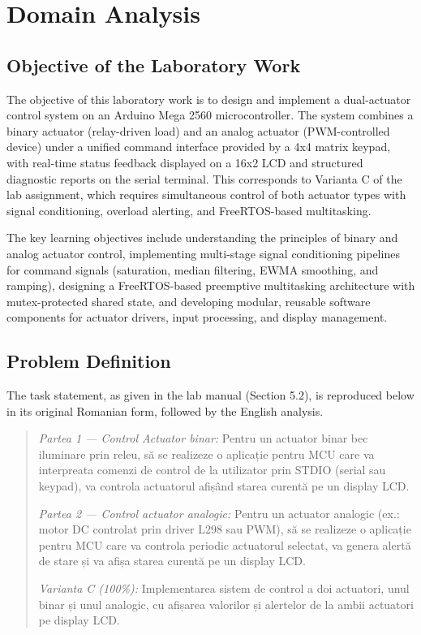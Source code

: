\section{Domain Analysis}

\subsection{Objective of the Laboratory Work}

The objective of this laboratory work is to design and implement a dual-actuator control system on an Arduino Mega 2560 microcontroller. The system combines a binary actuator (relay-driven load) and an analog actuator (PWM-controlled device) under a unified command interface provided by a 4x4 matrix keypad, with real-time status feedback displayed on a 16x2 LCD and structured diagnostic reports on the serial terminal. This corresponds to Varianta C of the lab assignment, which requires simultaneous control of both actuator types with signal conditioning, overload alerting, and FreeRTOS-based multitasking.

The key learning objectives include understanding the principles of binary and analog actuator control, implementing multi-stage signal conditioning pipelines for command signals (saturation, median filtering, EWMA smoothing, and ramping), designing a FreeRTOS-based preemptive multitasking architecture with mutex-protected shared state, and developing modular, reusable software components for actuator drivers, input processing, and display management.

\subsection{Problem Definition}

The task statement, as given in the lab manual (Section 5.2), is reproduced below in its original Romanian form, followed by the English analysis.

\begin{quote}
\textit{Partea 1 --- Control Actuator binar:} Pentru un actuator binar bec iluminare prin releu, să se realizeze o aplicație pentru MCU care va interpreata comenzi de control de la utilizator prin STDIO (serial sau keypad), va controla actuatorul afișând starea curentă pe un display LCD.

\textit{Partea 2 --- Control actuator analogic:} Pentru un actuator analogic (ex.: motor DC controlat prin driver L298 sau PWM), să se realizeze o aplicație pentru MCU care va controla periodic actuatorul selectat, va genera alertă de stare și va afișa starea curentă pe un display LCD.

\textit{Varianta C (100\%):} Implementarea sistem de control a doi actuatori, unul binar și unul analogic, cu afișarea valorilor și alertelor de la ambii actuatori pe display LCD.
\end{quote}

